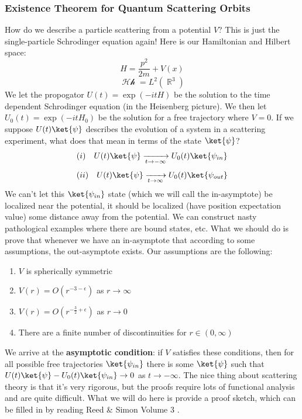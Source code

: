 \documentclass{article}
\DeclareMathOperator{\Hh}{\mathcal{Hh}}
\DeclareMathOperator{\RR}{\mathbb{R}}
\begin{document}
\subsubsection{Existence Theorem for Quantum Scattering Orbits}
How do we describe a particle scattering from a potential $V$? This is just the single-particle Schrodinger equation again! Here is our Hamiltonian and Hilbert space:
\[H = \frac{p^2}{2m}+V(x)\]
\[\Hh = L^2(\RR^3)\]
We let the propogator $U(t) = \exp(-itH)$ be the solution to the time dependent Schrodinger equation (in the Heisenberg picture). We then let $U_0(t) = \exp(-itH_0)$ be the solution for a free trajectory where $V=0$. If we suppose $U(t)\ket{\psi}$ describes the evolution of a system in a scattering experiment, what does that mean in terms of the state $\ket{\psi}$?
\[(i)\hspace{1em} U(t)\ket{\psi}\xrightarrow[t\to -\infty]{} U_0(t)\ket{\psi_{in}}\]
\[(ii) \hspace{1em}U(t)\ket{\psi}\xrightarrow[t\to \infty]{} U_0(t)\ket{\psi_{out}}\]
We can't let this $\ket{\psi_{in}}$ state (which we will call the in-asymptote) be localized near the potential, it should be localized (have position expectation value) some distance away from the potential. We can construct nasty pathological examples where there are bound states, etc. What we should do is prove that whenever we have an in-asymptote that according to some assumptions, the out-asymptote exists. Our assumptions are the following:
\begin{enumerate}
\item $V$ is spherically symmetric
\item $V(r) = O(r^{-3-\epsilon})$ as $r\to \infty$
\item $V(r) = O(r^{-\frac{3}{2}+\epsilon})$ as $r\to 0$
\item There are a finite number of discontinuities for $r\in (0,\infty)$
\end{enumerate}
We arrive at the \textbf{asymptotic condition}: if $V$ satisfies these conditions, then for all possible free trajectories $\ket{\psi_{in}}$ there is some $\ket{\psi}$ such that $U(t)\ket{\psi} - U_0(t)\ket{\psi_{in}} \to 0$ as $t\to -\infty$. The nice thing about scattering theory is that it's very rigorous, but the proofs require lots of functional analysis and are quite difficult. What we will do here is provide a proof sketch, which can be filled in by reading Reed \& Simon Volume 3 \cite{reed1979scattering}.
\end{document}

